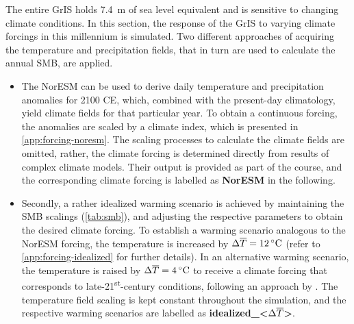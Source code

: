 The entire GrIS holds \SI{7.4}{\m} of sea level equivalent \parencite{morlighem2017} and is sensitive to changing climate conditions. In this section, the response of the GrIS to varying climate forcings in this millennium is simulated. Two different approaches of acquiring the temperature and precipitation fields, that in turn are used to calculate the annual SMB, are applied.
\begin{itemize}
	\item The NorESM can be used to derive daily temperature and precipitation anomalies for 2100 CE, which, combined with the present-day climatology, yield climate fields for that particular year. To obtain a continuous forcing, the anomalies are scaled by a climate index, which is presented in \cref{app:forcing-noresm}. The scaling processes to calculate the climate fields are omitted, rather, the climate forcing is determined directly from results of complex climate models. Their output is provided as part of the course, and the corresponding climate forcing is labelled as \textbf{NorESM} in the following.
	\item Secondly, a rather idealized warming scenario is achieved by maintaining the SMB scalings (\cref{tab:smb}), and adjusting the respective parameters to obtain the desired climate forcing. To establish a warming scenario analogous to the NorESM forcing, the temperature is increased by \(\Delta\overline{T}=\SI{12}{\celsius}\) (refer to \cref{app:forcing-idealized} for further details). In an alternative warming scenario, the temperature is raised by \(\Delta\overline{T}=\SI{4}{\celsius}\) to receive a climate forcing that corresponds to late-21\textsuperscript{st}-century conditions, following an approach by \textcite{greve2022}. The temperature field scaling is kept constant throughout the simulation, and the respective warming scenarios are labelled as \textbf{idealized\_<\(\Delta\overline{T}\)>}.
\end{itemize}

